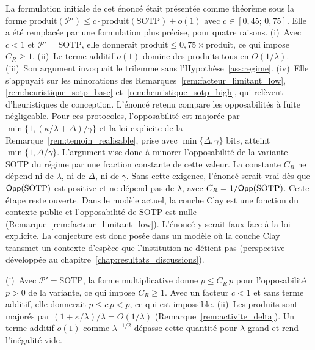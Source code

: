 \begin{sloppypar}
\begin{remark}\label{rem:statut_optimalite}
La formulation initiale de cet \'enonc\'e \'etait pr\'esent\'ee comme th\'eor\`eme sous la forme
$\text{produit}(\mathcal{P}') \leq c \cdot \text{produit}(\text{SOTP}) + o(1)$ avec
$c \in [0{,}45;\,0{,}75]$. Elle a \'et\'e remplac\'ee par une formulation plus pr\'ecise, pour
quatre raisons. (i)~Avec $c < 1$ et $\mathcal{P}' = \text{SOTP}$, elle donnerait
$\text{produit} \leq 0{,}75 \times \text{produit}$, ce qui impose $C_R \geq 1$.
(ii)~Le terme additif $o(1)$ domine des produits tous en $O(1/\lambda)$.
(iii)~Son argument invoquait le trilemme sans l'Hypoth\`ese~\ref{ass:regime}.
(iv)~Elle s'appuyait sur les minorations des Remarques~\ref{rem:facteur_limitant_low},
\ref{rem:heuristique_sotp_base} et~\ref{rem:heuristique_sotp_high}, qui rel\`event
d'heuristiques de conception. L'\'enonc\'e retenu compare les opposabilit\'es \`a fuite n\'egligeable.
Pour ces protocoles, l'opposabilit\'e est major\'ee par $\min\{1, (\kappa/\lambda + \Delta)/\gamma\}$ et la loi
explicite de la Remarque~\ref{rem:temoin_realisable}, prise avec $\min\{\Delta, \gamma\}$ bits, atteint
$\min\{1, \Delta/\gamma\}$. L'argument vise donc \`a
minorer l'opposabilit\'e de la variante SOTP du r\'egime par une fraction constante de cette valeur.
La constante $C_R$ ne d\'epend ni de $\lambda$, ni de $\Delta$, ni de $\gamma$. Sans cette exigence,
l'\'enonc\'e serait vrai d\`es que $\mathsf{Opp}(\text{SOTP})$ est positive et ne d\'epend pas de $\lambda$,
avec $C_R = 1/\mathsf{Opp}(\text{SOTP})$.
Cette \'etape reste ouverte. Dans le mod\`ele actuel, la couche Clay est une fonction du contexte
public et l'opposabilit\'e de SOTP est nulle (Remarque~\ref{rem:facteur_limitant_low}). L'\'enonc\'e y
serait faux face \`a la loi explicite. La conjecture est donc pos\'ee dans un mod\`ele
o\`u la couche Clay transmet un contexte d'esp\`ece que l'institution ne d\'etient pas (perspective
d\'evelopp\'ee au chapitre~\ref{chap:resultats_discussions}).
\end{remark}

\begin{Preuve}
(i)~Avec $\mathcal{P}' = \text{SOTP}$, la forme multiplicative donne $p \leq C_R\,p$ pour
l'opposabilit\'e $p > 0$ de la variante, ce qui impose $C_R \geq 1$. Avec un facteur
$c < 1$ et sans terme additif, elle donnerait $p \leq c\,p < p$, ce qui est impossible.
(ii)~Les produits sont major\'es par $(1+\kappa/\lambda)/\lambda = O(1/\lambda)$
(Remarque~\ref{rem:activite_delta}). Un terme additif $o(1)$ comme $\lambda^{-1/2}$
d\'epasse cette quantit\'e pour $\lambda$ grand et rend l'in\'egalit\'e vide.
\end{Preuve}


\end{sloppypar}
